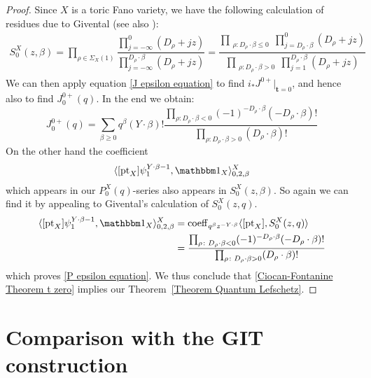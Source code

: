 \documentclass[11pt]{amsart}
\newcommand{\pt}{\operatorname{pt}}
\theoremstyle{definition}
\theoremstyle{definition}
\begin{document}
\begin{proof}
Since $X$ is a toric Fano variety, we have the following calculation of residues due to Givental \cite{Givental-mirror} (see also \cite[Definition 7.2.8]{CF-K}):
\begin{align*}
S_0^X(z,\beta) =\prod_{\rho\in\Sigma_X(1)}\dfrac{\prod_{j=-\infty}^0(D_{\rho}+jz)}{\prod_{j=-\infty}^{D_{\rho}\cdot \beta}(D_\rho+jz)}
=\dfrac{\prod_{\substack{\rho \colon D_\rho \cdot \beta\leq 0}} \prod_{j=D_\rho \cdot \beta}^0 (D_{\rho}+jz)}{\prod_{\substack{\rho\colon D_\rho \cdot\beta > 0}} \prod_{j=1}^{D_\rho\cdot\beta} (D_{\rho}+jz)}
\end{align*}
We can then apply equation \eqref{J epsilon equation} to find $i_*J^{0+}|_{\mathbf{t}=0}$, and hence also to find $J^{0+}_0(q)$. In the end we obtain:
\begin{equation*}
 J^{0+}_0(q)=\sum_{\beta\geq 0}q^\beta(Y\cdot\beta)!\frac{\prod_{\rho\colon D_\rho\cdot\beta< 0}(-1)^{-D_{\rho}\cdot\beta}(-D_{\rho}\cdot\beta)!}{\prod_{\rho\colon D_\rho\cdot\beta> 0}(D_{\rho}\cdot\beta)!}
\end{equation*}
On the other hand the coefficient
\begin{equation*} \langle[\pt_X]\psi_1^{Y\cdot\beta-1},\mathbbm 1_X\rangle_{0,2,\beta}^X\end{equation*}
which appears in our $P_0^X(q)$-series also appears in $S_0^X(z,\beta)$. So again we can find it by appealing to Givental's calculation of $S_0^X(z,q)$.
\begin{align*}
 \langle[\pt_X]\psi_1^{Y\cdot\beta-1},\mathbbm 1_X\rangle_{0,2,\beta}^X &=\operatorname{coeff}_{q^\beta z^{-Y\cdot\beta}}\langle [\pt_X],S_0^X(z,q) \rangle\\
& =\frac{\prod_{\rho\colon D_\rho\cdot\beta< 0}(-1)^{-D_{\rho}\cdot\beta}(-D_{\rho}\cdot\beta)!}{\prod_{\rho\colon D_\rho\cdot\beta> 0}(D_{\rho}\cdot\beta)!}
\end{align*}
which proves \eqref{P epsilon equation}. We thus conclude that \eqref{Ciocan-Fontanine Theorem t zero} implies our Theorem~\ref{Theorem Quantum Lefschetz}. \end{proof}

\appendix

\section{Comparison with the GIT construction} \label{Section comparison with GIT construction}
\end{document}
